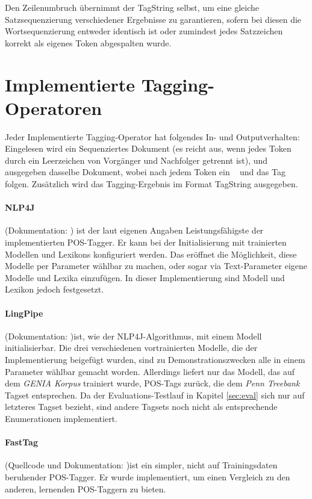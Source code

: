 Den Zeilenumbruch übernimmt der TagString selbst, um eine gleiche Satzsequenzierung verschiedener Ergebnisse zu garantieren, sofern bei diesen die Wortsequenzierung entweder identisch ist oder zumindest jedes Satzzeichen korrekt als eigenes Token abgespalten wurde.

\section{Implementierte Tagging-Operatoren}
Jeder Implementierte Tagging-Operator hat folgendes In- und Outputverhalten: Eingelesen wird ein Sequenziertes Dokument (es reicht aus, wenn jedes Token durch ein Leerzeichen von Vorgänger und Nachfolger getrennt ist), und ausgegeben dasselbe Dokument, wobei nach jedem Token ein \glqq \ \grqq{} und das Tag folgen. Zusätzlich wird das Tagging-Ergebnis im Format TagString ausgegeben.

\paragraph{NLP4J}
(Dokumentation: \cite{choi}) ist der laut eigenen Angaben Leistungsfähigste der implementierten POS-Tagger. Er kann bei der Initialisierung mit trainierten Modellen und Lexikons konfiguriert werden. Das eröffnet die Möglichkeit, diese Modelle per Parameter wählbar zu machen, oder sogar via Text-Parameter eigene Modelle und Lexika einzufügen. In dieser Implementierung sind Modell und Lexikon jedoch festgesetzt.
\paragraph{LingPipe}
(Dokumentation: \cite{Lingpipedoc})ist, wie der NLP4J-Algorithmus, mit einem Modell initialisierbar. Die drei verschiedenen vortrainierten Modelle, die der Implementierung beigefügt wurden, sind zu Demonstrationszwecken alle in einem Parameter wählbar gemacht worden. Allerdings liefert nur das Modell, das auf dem \textit{GENIA Korpus} \cite{GENIA} trainiert wurde, POS-Tags zurück, die dem \textit{Penn Treebank} Tagset entsprechen. Da der Evaluations-Testlauf in Kapitel \ref{sec:eval} sich nur auf letzteres Tagset bezieht, sind andere Tagsets noch nicht als entsprechende Enumerationen implementiert.
\paragraph{FastTag}
(Quellcode und Dokumentation: \cite{fasttagdoc})ist ein simpler, nicht auf Trainingsdaten beruhender POS-Tagger. Er wurde implementiert, um einen Vergleich zu den anderen, lernenden POS-Taggern zu bieten.




